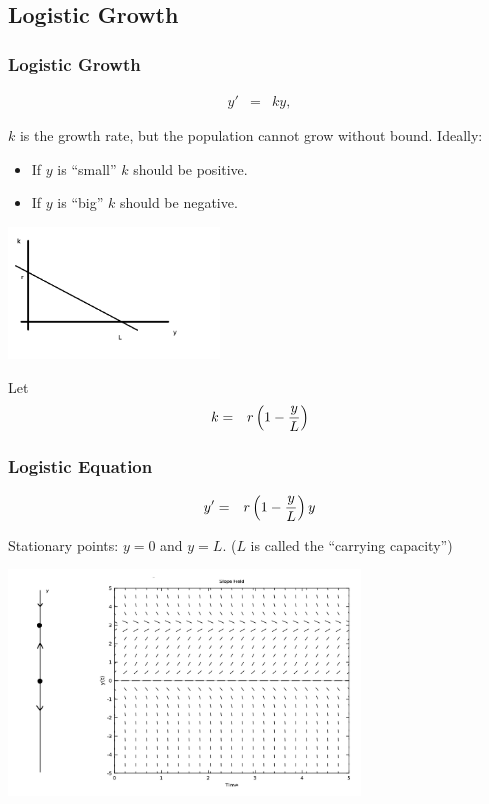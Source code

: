 


\subsection{Logistic Growth}

\begin{frame}
  \frametitle{Logistic Growth}

  \vspace*{-4em}
  \begin{eqnarray*}
    y' & = & ky,
  \end{eqnarray*}

  $k$ is the growth rate, but the population cannot grow without
  bound. Ideally:
  \begin{itemize}
  \item If $y$ is ``small'' $k$ should be positive.
  \item If $y$ is ``big'' $k$ should be negative.
  \end{itemize}

  \includegraphics[height=3.5cm]{img/week3GrowthRate}

  Let 
  \begin{eqnarray*}
    k & = & r \left( 1 - \frac{y}{L} \right)
  \end{eqnarray*}


\end{frame}


\begin{frame}
  \frametitle{Logistic Equation}

  \vspace*{-2em}
  \begin{eqnarray*}
    y' & = & r \left( 1 - \frac{y}{L} \right) y
  \end{eqnarray*}

  Stationary points: $y=0$ and $y=L$. 
  ($L$ is called the ``carrying capacity'')

  \includegraphics[height=6cm]{img/week3PhaseLineExample1}

\end{frame}


